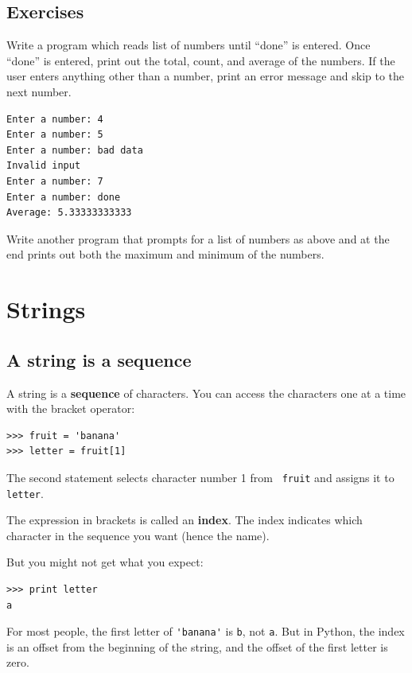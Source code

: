 \documentclass[10pt]{book}
\begin{document}
\section{Exercises}

\begin{ex}
Write a program which reads list of numbers until ``done'' is entered.
Once ``done'' is entered, print out the total, count, and average
of the numbers.  If the user enters anything other than a number, 
print an error message and skip to the next number.

\begin{verbatim}
Enter a number: 4
Enter a number: 5
Enter a number: bad data
Invalid input
Enter a number: 7
Enter a number: done
Average: 5.33333333333
\end{verbatim}
\end{ex}

\begin{ex}
Write another program that prompts for a list of numbers as above
and at the end prints out both the maximum and minimum of the numbers.
\end{ex}


\chapter{Strings}
\label{strings}


\section{A string is a sequence}

A string is a {\bf sequence} of characters.  
You can access the characters one at a time with the
bracket operator:

\beforeverb
\begin{verbatim}
>>> fruit = 'banana'
>>> letter = fruit[1]
\end{verbatim}
\afterverb
%
The second statement selects character number 1 from {\tt
fruit} and assigns it to {\tt letter}.  


The expression in brackets is called an {\bf index}.  
The index indicates which character in the sequence you
want (hence the name).

But you might not get what you expect:

\beforeverb
\begin{verbatim}
>>> print letter
a
\end{verbatim}
\afterverb
%
For most people, the first letter of \verb"'banana'" is {\tt b}, not
{\tt a}.  But in Python, the index is an offset from the
beginning of the string, and the offset of the first letter is zero.
\end{document}

